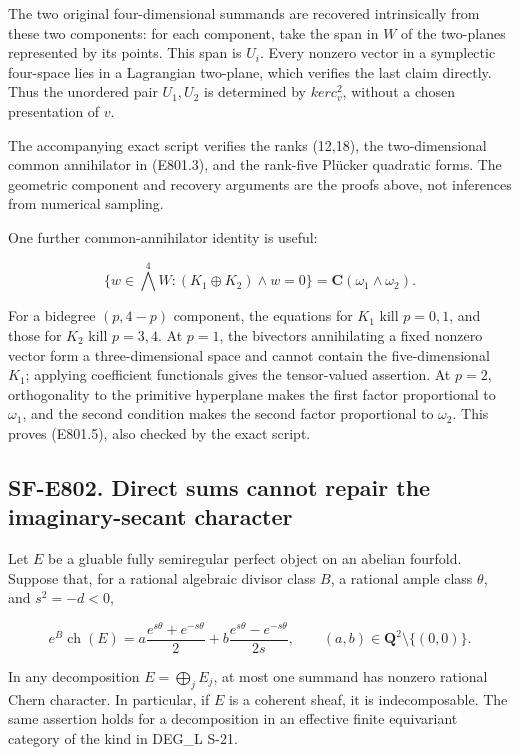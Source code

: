 The two original four-dimensional summands are recovered intrinsically
from these two components: for each component, take the span in \(W\) of
the two-planes represented by its points. This span is \(U_i\). Every
nonzero vector in a symplectic four-space lies in a Lagrangian
two-plane, which verifies the last claim directly. Thus the unordered
pair \({U_1,U_2}\) is determined by \(ker c_v^2\), without a chosen
presentation of \(v\).

The accompanying exact script verifies the ranks (12,18), the
two-dimensional common annihilator in (E801.3), and the rank-five
Plücker quadratic forms. The geometric component and recovery arguments
are the proofs above, not inferences from numerical sampling.

One further common-annihilator identity is useful:

\[
 \{w\in\bigwedge^4W:(K_1\oplus K_2)\wedge w=0\}
       =\mathbf C(\omega_1\wedge\omega_2).
 \tag{E801.5}
\]

For a bidegree \((p,4-p)\) component, the equations for \(K_1\) kill
\(p=0,1\), and those for \(K_2\) kill \(p=3,4\). At \(p=1\), the
bivectors annihilating a fixed nonzero vector form a three-dimensional
space and cannot contain the five-dimensional \(K_1\); applying
coefficient functionals gives the tensor-valued assertion. At \(p=2\),
orthogonality to the primitive hyperplane makes the first factor
proportional to \(\omega_1\), and the second condition makes the second
factor proportional to \(\omega_2\). This proves (E801.5), also checked
by the exact script.

\subsection{SF-E802. Direct sums cannot repair the imaginary-secant
character}\label{SF-E802}

Let \(E\) be a gluable fully semiregular perfect object on an abelian
fourfold. Suppose that, for a rational algebraic divisor class \(B\), a
rational ample class \(\theta\), and \(s^2=-d<0\),

\[
 e^B\operatorname{ch}(E)
 =a\frac{e^{s\theta}+e^{-s\theta}}2
  +b\frac{e^{s\theta}-e^{-s\theta}}{2s},
 \qquad (a,b)\in\mathbf Q^2\setminus\{(0,0)\}.
 \tag{E802.1}
\]

In any decomposition \(E=\bigoplus_jE_j\), at most one summand has
nonzero rational Chern character. In particular, if \(E\) is a coherent
sheaf, it is indecomposable. The same assertion holds for a
decomposition in an effective finite equivariant category of the kind in
DEG\_L S-21.

